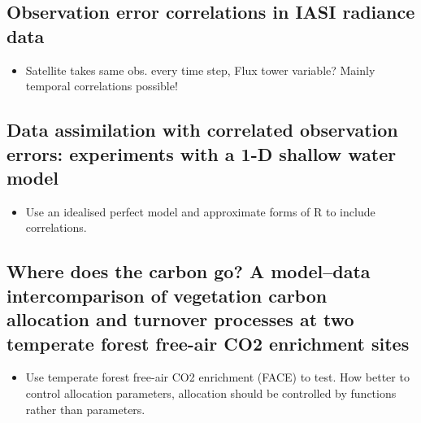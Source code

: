 \documentclass[11pt]{article}
\begin{document}
\subsection*{Observation error correlations in IASI radiance data \cite{stewart2009observation}}

\begin{itemize}
\item Satellite takes same obs. every time step, Flux tower variable? Mainly temporal correlations possible!
\end{itemize}

\subsection*{Data assimilation with correlated observation errors: experiments with a 1-D shallow water model \cite{stewart2013data}}

\begin{itemize}
\item Use an idealised perfect model and approximate forms of R to include correlations.
\end{itemize}

\subsection*{Where does the carbon go? A model--data intercomparison of vegetation carbon allocation and turnover processes at two temperate forest free-air CO2 enrichment sites \cite{de2014does}}

\begin{itemize}
\item Use temperate forest free-air CO2 enrichment (FACE) to test. How better to control allocation parameters, allocation should be controlled by functions rather than parameters.
\end{itemize}


{}

\end{document}
